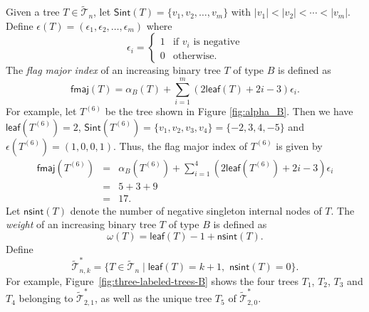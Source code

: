 \documentclass[12pt]{article}
\numberwithin{equation}{section}
\theoremstyle{plain}
\def\fmaj{\mathsf{fmaj}}
\def\nsint{\mathsf{nsint}}
\def\Sint{\mathsf{Sint}}
\def\B{\mathcal{T}}
\def\leaf{\mathsf{leaf}}
\begin{document}
	
	 Given a tree $T\in \widetilde{\B}_n$, let $\Sint(T)=\{v_1, v_2, \ldots, v_{m}\}$ with $|v_1|<|v_2|<\cdots<|v_m|$. 
	  Define  $\epsilon(T)=(\epsilon_1, \epsilon_2, \ldots, \epsilon_m)$ where 
	 	$$
	 	\epsilon_i=\left\{
	 	\begin{array}{ll}
	 		1 & \text{if  $v_i$ is negative} \\[2pt]
	 		0& \text{otherwise}.
	 	\end{array}
	 	\right.
	 	$$
	 	The {\em flag major index} of an increasing binary tree $T$ of type $B$  is defined as 
	 	$$
	 	\fmaj(T)=\alpha_B(T)+\sum\limits_{i=1}^{m}(2\leaf(T)+2i-3) \epsilon_i.
	 	$$
	 	For example, let $T^{(6)}$ be the tree  shown in Figure \ref{fig:alpha_B}. Then we have $\leaf(T^{(6)})=2$, 
	 	$\Sint(T^{(6)})=\{v_1, v_2, v_3, v_4\}=\{-2, 3,4,-5\}$ and 
	 	$\epsilon(T^{(6)})=(1,0,0,1)$.  Thus, the flag major index of $T^{(6)}$ is given by
	 	$$
	 	\begin{array}{lll}
	 	\fmaj(T^{(6)})&=&\alpha_B(T^{(6)})+\sum\limits_{i=1}^{4}(2\leaf(T^{(6)})+2i-3) \epsilon_i\\
	 	&=& 5+ 3+9\\
	 	&=& 17.
	 	\end{array}
	 	$$
	 	Let  $\nsint(T)$ denote the number of negative   singleton internal nodes  of $T$. 
	 	The {\em weight} of an increasing binary tree $T$ of type $B$  is defined as 
	 	$$
	 	\omega(T)=\leaf(T)-1+\nsint(T).
	 	$$
	 	Define 
	 	$$\widetilde{\B}^*_{n,k}=\{T\in\widetilde{\B}_n\mid  \leaf(T)=k+1, \,\, \nsint(T)=0\}.$$
	 		For example, Figure~\ref{fig:three-labeled-trees-B} shows the  four trees $T_1$, $T_2$, $T_3$ and $T_4$ belonging to $\widetilde{\B}^*_{2,1}$, as well as the unique tree $T_5$ of $\widetilde{\B}^*_{2,0}$.
	 	
	 	
	 	
\end{document}
